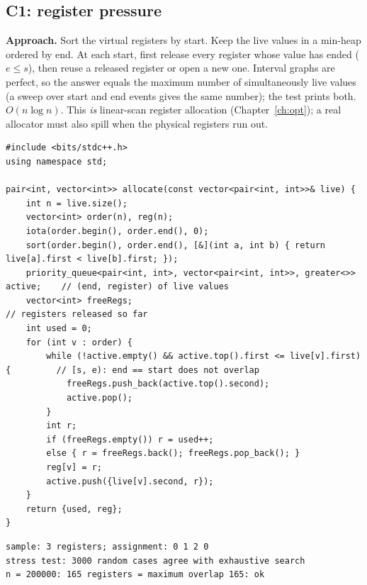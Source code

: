 \documentclass[10pt,a4paper,openany,oneside]{report}
\begin{document}
\subsection{C1: register pressure}
\textbf{Approach.} Sort the virtual registers by start. Keep the live values in a min-heap ordered by end. At each start, first release every register whose value has ended ($e\le s$), then reuse a released register or open a new one. Interval graphs are perfect, so the answer equals the maximum number of simultaneously live values (a sweep over start and end events gives the same number); the test prints both. $O(n\log n)$. This \emph{is} linear-scan register allocation (Chapter~\ref{ch:opt}); a real allocator must also spill when the physical registers run out.
\begin{lstlisting}[language={[11]C++},basicstyle=\ttfamily\fontsize{7.2}{8.6}\selectfont,title={C1 solution (C++)}]
#include <bits/stdc++.h>
using namespace std;

pair<int, vector<int>> allocate(const vector<pair<int, int>>& live) {
    int n = live.size();
    vector<int> order(n), reg(n);
    iota(order.begin(), order.end(), 0);
    sort(order.begin(), order.end(), [&](int a, int b) { return live[a].first < live[b].first; });
    priority_queue<pair<int, int>, vector<pair<int, int>>, greater<>> active;    // (end, register) of live values
    vector<int> freeRegs;                                                        // registers released so far
    int used = 0;
    for (int v : order) {
        while (!active.empty() && active.top().first <= live[v].first) {         // [s, e): end == start does not overlap
            freeRegs.push_back(active.top().second);
            active.pop();
        }
        int r;
        if (freeRegs.empty()) r = used++;
        else { r = freeRegs.back(); freeRegs.pop_back(); }
        reg[v] = r;
        active.push({live[v].second, r});
    }
    return {used, reg};
}
\end{lstlisting}
\begin{lstlisting}[style=out,basicstyle=\ttfamily\fontsize{7.2}{8.6}\selectfont,title={C1: sample, stress test against exhaustive search, maximum size}]
sample: 3 registers; assignment: 0 1 2 0
stress test: 3000 random cases agree with exhaustive search
n = 200000: 165 registers = maximum overlap 165: ok
\end{lstlisting}
\end{document}
